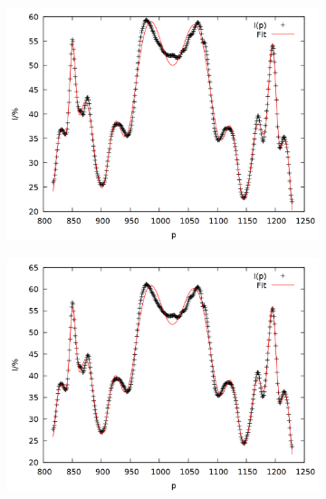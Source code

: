 \begin{figure}
\begin{subfigure}{0.45\textwidth}
\includegraphics[width=\textwidth]{data/zeeman/out_6_6.png}
\end{subfigure}
\begin{subfigure}{0.45\textwidth}
\includegraphics[width=\textwidth]{data/zeeman/out_6_9.png}
\end{subfigure}
\begin{subfigure}{0.45\textwidth}

\end{subfigure}
\end{figure}
